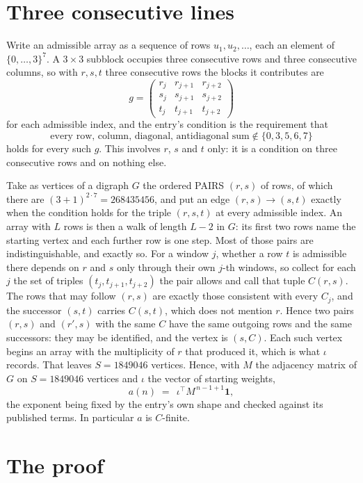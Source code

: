 \documentclass[11pt,a4paper]{article}
\theoremstyle{plain}
\theoremstyle{definition}
\begin{document}
\section{Three consecutive lines}

Write an admissible array as a sequence of rows $u_1,u_2,\dots$, each an element of
$\{0,\dots,3\}^{7}$. A $3\times3$ subblock occupies three consecutive rows and
three consecutive columns, so with $r,s,t$ three consecutive rows the blocks it
contributes are
\[
g=\begin{pmatrix}r_j&r_{j+1}&r_{j+2}\\ s_j&s_{j+1}&s_{j+2}\\ t_j&t_{j+1}&t_{j+2}\end{pmatrix}
\]
for each admissible index, and the entry's condition is the requirement that
\[
\text{every row, column, diagonal, antidiagonal sum} \notin \{0,3,5,6,7\}
\]
holds for every such $g$. This involves $r$, $s$ and $t$ only: it is a condition on
three consecutive rows and on nothing else.

Take as vertices of a digraph $G$ the ordered PAIRS $(r,s)$ of rows, of which there are
$(3+1)^{2\cdot7}=268435456$, and put an edge $(r,s)\to(s,t)$ exactly when the condition
holds for the triple $(r,s,t)$ at every admissible index. An array with $L$ rows is then a
walk of length $L-2$ in $G$: its first two rows name the starting vertex and each further
row is one step. Most of those pairs are indistinguishable, and exactly so. For a window $j$, whether a row $t$ is admissible there depends on $r$ and $s$ only through their own $j$-th windows, so collect for each $j$ the set of triples $(t_j,t_{j+1},t_{j+2})$ the pair allows and call that tuple $C(r,s)$. The rows that may follow $(r,s)$ are exactly those consistent with every $C_j$, and the successor $(s,t)$ carries $C(s,t)$, which does not mention $r$. Hence two pairs $(r,s)$ and $(r',s)$ with the same $C$ have the same outgoing rows and the same successors: they may be identified, and the vertex is $(s,C)$. Each such vertex begins an array with the multiplicity of $r$ that produced it, which is what $\iota$ records. That leaves $S=1849046$ vertices. Hence, with $M$ the adjacency matrix of $G$ on $S=1849046$ vertices and
$\iota$ the vector of starting weights,
\[
a(n)\;=\;\,\iota^{\!\top}M^{\,n-1+1}\mathbf{1},
\]
the exponent being fixed by the entry's own shape and checked against its published terms.
In particular $a$ is $C$-finite.

\section{The proof}
\end{document}
